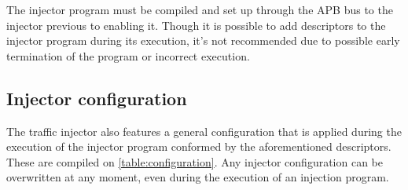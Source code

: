 The injector program must be compiled and set up through the APB bus to the injector previous to enabling it. 
Though it is possible to add descriptors to the injector program during its execution, it's not recommended due to possible early termination of the program 
or incorrect execution.


\subsection{Injector configuration}
\label{module desc-config}

The traffic injector also features a general configuration that is applied during the execution of the injector program conformed by the aforementioned 
descriptors. These are compiled on \autoref{table:configuration}. 
Any injector configuration can be overwritten at any moment, even during the execution of an injection program.

